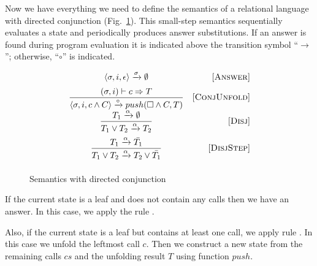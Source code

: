 
Now we have everything we need to define the semantics of a relational language with directed conjunction (Fig.~\ref{fair:classic-semantics}). This small-step semantics sequentially
evaluates a state and periodically produces answer substitutions. If an answer is found during program evaluation it is indicated above the transition
symbol ``$\xrightarrow{}$''; otherwise, ``$\circ$'' is indicated.

\begin{figure}[h!]
\[\begin{array}{cr}
     {\langle \sigma, i, \epsilon \rangle \xrightarrow{\sigma} \emptyset}  
&     \mbox{[\textsc{Answer}]} \\[2mm]
\dfrac{(\sigma, i) \vdash c \Rightarrow T}
      {\langle \sigma, i, c \land C \rangle \xrightarrow{\circ} push(\Box \land C, T)}
&     \mbox{[\textsc{ConjUnfold}]} \\[2mm]
\dfrac{T_1 \xrightarrow{\alpha} \emptyset}
      {T_1 \lor T_2 \xrightarrow{\alpha} T_2}
&     \mbox{[\textsc{Disj}]} \\[4mm]
\dfrac{T_1 \xrightarrow{\alpha} \bar{T_1}}
      {T_1 \lor T_2 \xrightarrow{\alpha} T_2 \lor\bar{T_1}}
&     \mbox{[\textsc{DisjStep}]} \\[4mm]
\end{array}\]
\caption{Semantics with directed conjunction}
\label{fair:classic-semantics}
\end{figure}

If the current state is a leaf and does not contain any calls then we have an answer. In this case, we apply the rule .

Also, if the current state is a leaf but contains at least one call, we apply rule . In this case we unfold the leftmost call $c$.
Then we construct a new state from the remaining calls $cs$ and the unfolding result $T$ using function $push$.

